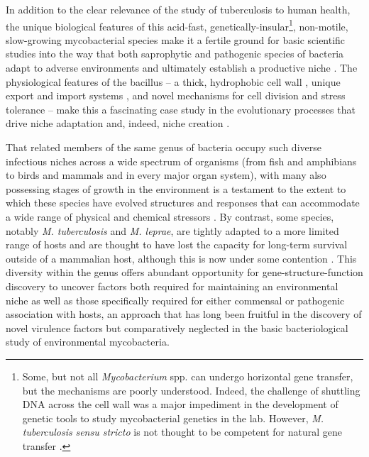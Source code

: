 In addition to the clear relevance of the study of tuberculosis to human health, the unique biological features of this acid\hyp{}fast, genetically\hyp{}insular\footnote{Some, but not all \textit{Mycobacterium} spp. can undergo horizontal gene transfer, but the mechanisms are poorly understood. Indeed, the challenge of shuttling DNA across the cell wall was a major impediment in the development of genetic tools to study mycobacterial genetics in the lab. However, \textit{M. tuberculosis} \textit{sensu stricto} is not thought to be competent for natural gene transfer \citep{Madacki2021, Reva2015, Merker2015, Galagan2014, Boritsch2016, Derbyshire2014, Krzywinska2004}.}, non\hyp{}motile, slow\hyp{}growing mycobacterial species make it a fertile ground for basic scientific studies into the way that both saprophytic and pathogenic species of bacteria adapt to adverse environments and ultimately establish a productive niche \citep{Prasanthi2014, Falkinham2009, Ghodbane2014, Houben2006, Pieters2002, Delafont2014}. The physiological features of the bacillus -- a thick, hydrophobic cell wall \citep{Chatterjee1997, Jarlier1994, Jankute2015}, unique export and import systems \citep{Houben2014, Bunduc2020, Famelis2019, Pandey2008, Tullius2011, Braibant2000, Wong2017a, Palmer2017}, and novel mechanisms for cell division \citep{Hett2008, Odermatt2020, Dziadek2003, Kieser2014} and stress tolerance \citep{Garg2015, Peddireddy2017} -- make this a fascinating case study in the evolutionary processes that drive niche adaptation and, indeed, niche creation \citep{Lovewell2021, Honda2018, Lerner2016, Gengenbacher2012, Sarathy2020, Warner2007, Chapman1971, deChastellier2009, Gagneux2018, Pereira2020}. 

That related members of the same genus of bacteria occupy such diverse infectious niches across a wide spectrum of organisms (from fish and amphibians to birds and mammals and in every major organ system), with many also possessing stages of growth in the environment is a testament to the extent to which these species have evolved structures and responses that can accommodate a wide range of physical and chemical stressors \citep{Thoen1981, Palmer2011, Hershberg2016, Saelens2019, Larsen2020}. By contrast, some species, notably \textit{M. tuberculosis} and \textit{M. leprae}, are tightly adapted to a more limited range of hosts and are thought to have lost the capacity for long\hyp{}term survival outside of a mammalian host, although this is now under some contention \citep{Ploemacher2020, Borham2022, Martinez2019, Mtetwa2022}. This diversity within the genus offers abundant opportunity for gene\hyp{}structure\hyp{}function discovery to uncover factors both required for maintaining an environmental niche as well as those specifically required for either commensal or pathogenic association with hosts, an approach that has long been fruitful in the discovery of novel virulence factors \citep{Sassetti2003, Ehrt2015} but comparatively neglected in the basic bacteriological study of environmental mycobacteria.

